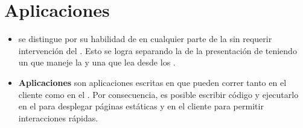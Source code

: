 
\section{Aplicaciones \webINT}\label{cap:estadoArte:section:web_app}

\begin{itemize}
	\item
		\textbf{\singlePageAppINT} se distingue por su habilidad de \redrawCPT en cualquier parte de la \uiSiglaAS sin requerir intervención del \serverAS. Esto se logra separando la \dataPC de la presentación de \dataPC teniendo un \modelLayerAS que maneje la \dataPC y una \viewsLayerAS que lea desde los \modelsAS.
	\item
		\textbf{Aplicaciones \isomorphicAS \javaScriptNAME} son aplicaciones escritas en \javaScriptNAME que pueden correr tanto en el cliente como en el \serverAS. Por consecuencia, es posible escribir código y ejecutarlo en el \serverAS para desplegar páginas estáticas y en el cliente para permitir interacciones rápidas.
\end{itemize}

%

